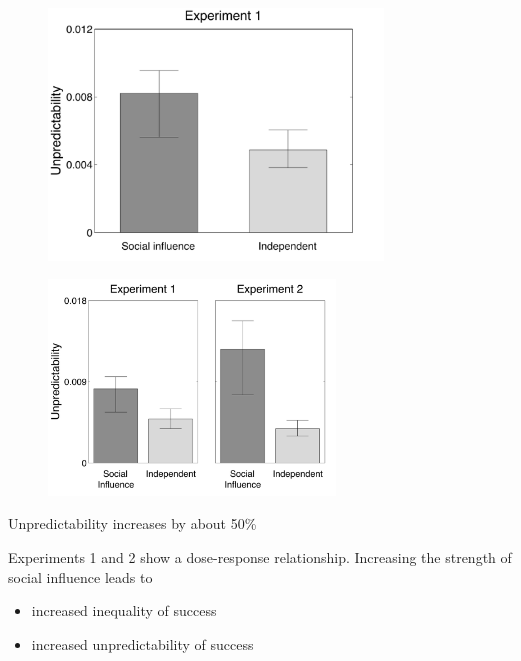\documentclass[aspectratio=169]{beamer}
\begin{document}
\begin{frame}

\begin{figure}
  \centering
  \includegraphics[width = 3.5in]{figures/unpredictability_v1}
\end{figure}

\end{frame}
\begin{frame}

\begin{figure}
  \centering
  \includegraphics[width=3in]{figures/compare_unpred_v1v2}
\end{figure}

Unpredictability increases by about 50\%
\end{frame}
\begin{frame}

Experiments 1 and 2 show a dose-response relationship.  Increasing the strength of social influence leads to

\begin{itemize}
  \item increased inequality of success
  \item increased unpredictability of success
\end{itemize}

\vspace{0.4in}

\end{frame}
\end{document}
